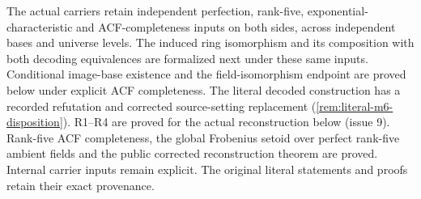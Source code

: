 \documentclass[11pt,oneside]{article}
\theoremstyle{definition}
\theoremstyle{remark}
\begin{document}
The actual carriers retain independent perfection, rank-five, exponential-characteristic
and ACF-completeness inputs on both sides, across independent bases and universe levels.
The induced ring isomorphism and its composition with both decoding equivalences are
formalized next under these same inputs. Conditional image-base existence and the
field-isomorphism endpoint are proved below under explicit ACF completeness. The literal
decoded construction has a recorded refutation and corrected source-setting replacement
(\cref{rem:literal-m6-disposition}). R1--R4 are proved for the actual reconstruction below
(issue 9). Rank-five
ACF completeness, the global
Frobenius setoid over perfect rank-five ambient fields and the public corrected
reconstruction theorem are proved. Internal carrier inputs remain explicit.
The original literal statements and proofs retain their exact provenance.
\end{document}
